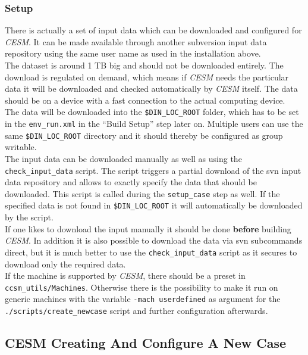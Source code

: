 \documentclass[]{article}
\begin{document}
\subsubsection{Setup}\label{setup}

There is actually a set of input data which can be downloaded and
configured for \emph{CESM}. It can be made available through another
subversion input data repository using the same user name as used in the
installation above.\\
The dataset is around 1 TB big and should not be downloaded entirely.
The download is regulated on demand, which means if \emph{CESM} needs
the particular data it will be downloaded and checked automatically by
\emph{CESM} itself. The data should be on a device with a fast
connection to the actual computing device.\\
The data will be downloaded into the \texttt{\$DIN\_LOC\_ROOT} folder,
which has to be set in the \texttt{env\_run.xml} in the ``Build Setup''
step later on. Multiple users can use the same \texttt{\$DIN\_LOC\_ROOT}
directory and it should thereby be configured as group writable.\\
The input data can be downloaded manually as well as using the
\texttt{check\_input\_data} script. The script triggers a partial
download of the svn input data repository and allows to exactly specify
the data that should be downloaded. This script is called during the
\texttt{setup\_case} step as well. If the specified data is not found in
\texttt{\$DIN\_LOC\_ROOT} it will automatically be downloaded by the
script.\\
If one likes to download the input manually it should be done
\textbf{before} building \emph{CESM}. In addition it is also possible to
download the data via svn subcommands direct, but it is much better to
use the \texttt{check\_input\_data} script as it secures to download
only the required data.\\
If the machine is supported by \emph{CESM}, there should be a preset in
\texttt{ccsm\_utils/Machines}. Otherwise there is the possibility to
make it run on generic machines with the variable
\texttt{-mach\ userdefined} as argument for the
\texttt{./scripts/create\_newcase} script and further configuration
afterwards.

\subsection{CESM Creating And Configure A New
Case}\label{cesm-creating-and-configure-a-new-case}
\end{document}
